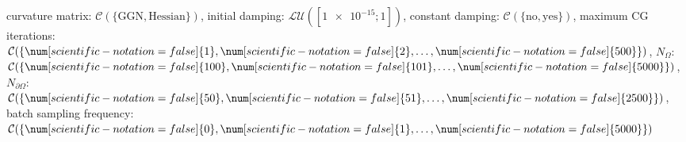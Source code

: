 curvature matrix: $\mathcal{C}(\{\text{GGN},\text{Hessian}\})$, initial damping: $\mathcal{LU}([\num[scientific-notation=true]{1e-15}; \num[scientific-notation=false]{1}])$, constant damping: $\mathcal{C}(\{\text{no},\text{yes}\})$, maximum CG iterations: $\mathcal{C}(\{\num[scientific-notation=false]{1},\num[scientific-notation=false]{2},\text{\dots},\num[scientific-notation=false]{500}\})$, $N_{\Omega}$: $\mathcal{C}(\{\num[scientific-notation=false]{100},\num[scientific-notation=false]{101},\text{\dots},\num[scientific-notation=false]{5000}\})$, $N_{\partial\Omega}$: $\mathcal{C}(\{\num[scientific-notation=false]{50},\num[scientific-notation=false]{51},\text{\dots},\num[scientific-notation=false]{2500}\})$, batch sampling frequency: $\mathcal{C}(\{\num[scientific-notation=false]{0},\num[scientific-notation=false]{1},\text{\dots},\num[scientific-notation=false]{5000}\})$
